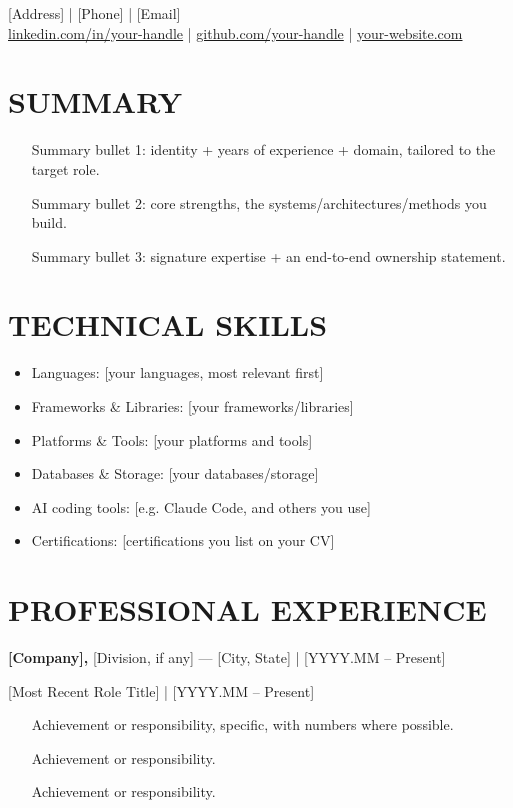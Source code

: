 \documentclass[11pt,letterpaper]{article}
\newcommand{\cvname}[1]{\begin{center}{\color{cvblue}\bfseries\fontsize{20}{24}\selectfont #1}\end{center}}
\newcommand{\cvcontact}[1]{\begin{center}#1\end{center}\vspace{-2pt}}
\begin{document}
\cvname{[Your Name]}
\cvcontact{[Address] | [Phone] | [Email] \\
\href{https://www.linkedin.com/in/your-handle}{linkedin.com/in/your-handle} | \href{https://github.com/your-handle}{github.com/your-handle} | \href{https://your-website.com}{your-website.com}}

\section*{SUMMARY}
\begin{itemize}
\item [Summary bullet 1: identity + years of experience + domain, tailored to the target role.]
\item [Summary bullet 2: core strengths, the systems/architectures/methods you build.]
\item [Summary bullet 3: signature expertise + an end-to-end ownership statement.]
\end{itemize}

\section*{TECHNICAL SKILLS}
\begin{itemize}
\item Languages: [your languages, most relevant first]
\item Frameworks \& Libraries: [your frameworks/libraries]
\item Platforms \& Tools: [your platforms and tools]
\item Databases \& Storage: [your databases/storage]
\item AI coding tools: [e.g. Claude Code, and others you use]
\item Certifications: [certifications you list on your CV]
\end{itemize}

\section*{PROFESSIONAL EXPERIENCE}

\textbf{[Company],} [Division, if any] --- [City, State] | [YYYY.MM -- Present]

[Most Recent Role Title] | [YYYY.MM -- Present]
\begin{itemize}
\item [Achievement or responsibility, specific, with numbers where possible.]
\item [Achievement or responsibility.]
\item [Achievement or responsibility.]
\end{itemize}
\end{document}
